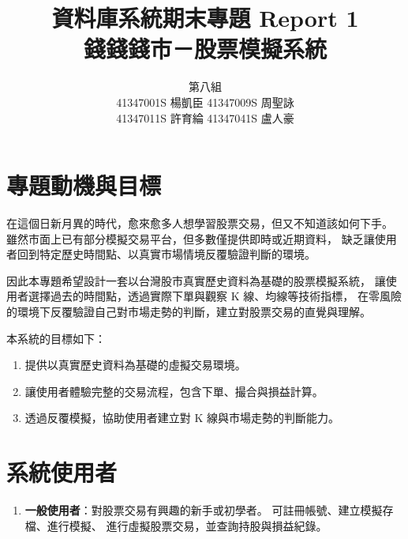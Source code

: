 \documentclass[UTF8, a4paper, 12pt, fontset=none]{ctexart}
\title{資料庫系統期末專題 Report 1\\ \textbf{錢錢錢市－股票模擬系統}}
\author{
    \begin{tabular}{c}
        第八組 \\ 
        41347001S 楊凱臣 \quad 41347009S 周聖詠 \\ 
        41347011S 許育綸 \quad 41347041S 盧人豪
    \end{tabular}
}
\date{}
\begin{document}
    \maketitle

    \section{專題動機與目標}
    在這個日新月異的時代，愈來愈多人想學習股票交易，但又不知道該如何下手。
    雖然市面上已有部分模擬交易平台，但多數僅提供即時或近期資料，
    缺乏讓使用者回到特定歷史時間點、以真實市場情境反覆驗證判斷的環境。

    因此本專題希望設計一套以台灣股市真實歷史資料為基礎的股票模擬系統，
    讓使用者選擇過去的時間點，透過實際下單與觀察 K 線、均線等技術指標，
    在零風險的環境下反覆驗證自己對市場走勢的判斷，建立對股票交易的直覺與理解。

    本系統的目標如下：
    \begin{enumerate}
        \item 提供以真實歷史資料為基礎的虛擬交易環境。
        \item 讓使用者體驗完整的交易流程，包含下單、撮合與損益計算。
        \item 透過反覆模擬，協助使用者建立對 K 線與市場走勢的判斷能力。
    \end{enumerate}

    \section{系統使用者}
    \begin{enumerate}
        \item \textbf{一般使用者}：對股票交易有興趣的新手或初學者。
            可註冊帳號、建立模擬存檔、進行模擬、
            進行虛擬股票交易，並查詢持股與損益紀錄。
    \end{enumerate}

    
\end{document}
